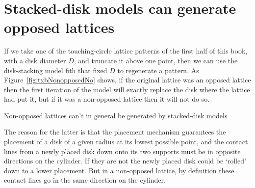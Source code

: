 \clearpage
\section{Stacked-disk models can generate opposed lattices}
If we take one of the touching-circle lattice patterns of the first half of this book, with a disk diameter $D$, and truncate it above one point, then
we can use the disk-stacking model fith that fixed $D$ to regenerate a pattern. As Figure~\ref{fig:txbNonopposedNo} shows, if the original lattice was an opposed lattice then the first iteration of the model will exactly replace the disk where the lattice had put it, but if it was a non-opposed lattice then it will not do so.
\begin{marginfigure}
	\centering
	\caption{Non-opposed lattices can't in general be generated by stacked-disk models}\label{fig:txbNonopposedNo}
\end{marginfigure}
The reason for the latter is that the placement mechanism guarantees the placement of a disk of a given radius at its lowest possible point, and the contact lines from a newly placed disk down onto its two supports must be in opposite directions on the cylinder. If they are not the newly placed disk could be `rolled' down to a lower placement. But in a non-opposed lattice, by definition these contact lines go in the same direction on the cylinder.
\clearpage

